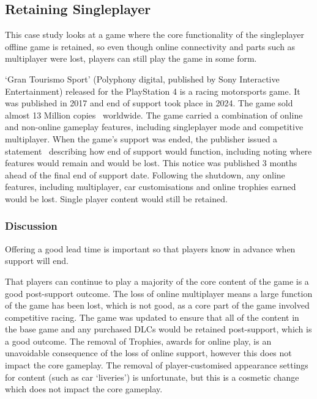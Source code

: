 \subsection{Retaining Singleplayer}
This case study looks at a game where the core functionality of the singleplayer offline game is retained,
so even though online connectivity and parts such as multiplayer were lost,
players can still play the game in some form.

`Gran Tourismo Sport' (Polyphony digital, published by Sony Interactive Entertainment) released for the PlayStation 4 is a racing motorsports game.
It was published in 2017 and end of support took place in 2024.
The game sold almost 13 Million copies~\cite{gtsport-sales-2023} worldwide.
The game carried a combination of online and non-online gameplay features, including singleplayer mode and competitive multiplayer.
When the game's support was ended, the publisher issued a statement~\cite{gtsport-eos-2023} describing how end of support would function,
including noting where features would remain and would be lost.
This notice was published 3 months ahead of the final end of support date.
Following the shutdown, any online features, including multiplayer, car customisations and online trophies earned would be lost.
Single player content would still be retained.

\subsubsection*{Discussion}
Offering a good lead time is important so that players know in advance when support will end.

That players can continue to play a majority of the core content of the game is a good post-support outcome.
The loss of online multiplayer means a large function of the game has been lost, which is not good, as a core part of the game involved competitive racing.
The game was updated to ensure that all of the content in the base game and any purchased DLCs would be retained post-support, which is a good outcome.
The removal of Trophies, awards for online play, is an unavoidable consequence of the loss of online support, however this does not impact the core gameplay.
The removal of player-customised appearance settings for content (such as car `liveries') is unfortunate, but this is a cosmetic change which does not impact the core gameplay.

